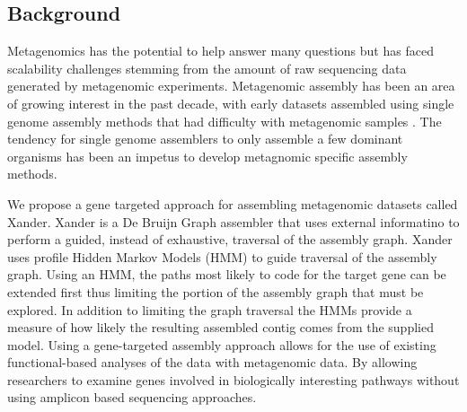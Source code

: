 \documentclass[10pt]{bmc_article}
\newenvironment{bmcformat}{\begin{raggedright}\baselineskip20pt\sloppy\setboolean{publ}{false}}{\end{raggedright}\baselineskip20pt\sloppy}
\begin{document}
\begin{bmcformat}




\section*{Background}
Metagenomics has the potential to help answer many questions but has faced scalability challenges stemming from the amount of raw sequencing data generated by metagenomic experiments\cite{pop_comparative_2004,treangen_repetitive_2011}.  Metagenomic assembly has been an area of growing interest in the past decade, with early datasets assembled using single genome assembly methods that had difficulty with metagenomic samples \cite{venter_environmental_2004,qin_human_2010}. The tendency for single genome assemblers to only assemble a few dominant organisms has been an impetus to develop metagnomic specific assembly methods\cite{namiki_metavelvet:_2012}.

We propose a gene targeted approach for assembling metagenomic datasets called Xander.  Xander is a De Bruijn Graph\cite{de_bruijn_combinatorial_1946} assembler\cite{compeau_how_2011} that uses external informatino to perform a guided, instead of exhaustive, traversal of the assembly graph.  Xander uses profile Hidden Markov Models (HMM) \cite{eddy_what_2004-1} to guide traversal of the assembly graph. Using an HMM, the paths most likely to code for the target gene can be extended first thus limiting the portion of the assembly graph that must be explored.  In addition to limiting the graph traversal the HMMs provide a measure of how likely the resulting assembled contig comes from the supplied model.  Using a gene-targeted assembly approach allows for the use of existing functional-based analyses of the data with metagenomic data.  By allowing researchers to examine genes involved in biologically interesting pathways without using amplicon based sequencing approaches.


\end{bmcformat}
\end{document}
